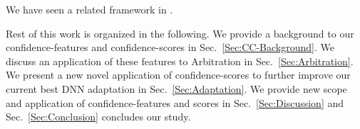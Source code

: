 We have seen a related framework in \cite{Nuance_Arbitration}.

Rest of this work is organized in the following. We provide a background to our confidence-features and confidence-scores in Sec.~\ref{Sec:CC-Background}. We discuss an application of these features to Arbitration in Sec.~\ref{Sec:Arbitration}. We present a new novel application of confidence-scores to further improve our current best DNN adaptation in Sec.~\ref{Sec:Adaptation}. We provide new scope and application of confidence-features and scores in Sec.~\ref{Sec:Discussion} and Sec.~\ref{Sec:Conclusion} concludes our study.

